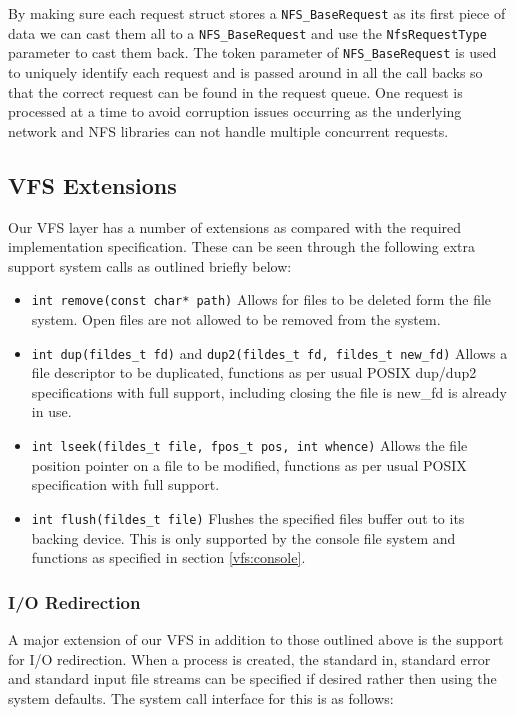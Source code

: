\documentclass[12pt,english]{article}
\begin{document}
By making sure each request struct stores a \texttt{NFS\_BaseRequest} as its first piece of data we can cast them all to a \texttt{NFS\_BaseRequest} and use the \texttt{NfsRequestType} parameter to cast them back. The token parameter of \texttt{NFS\_BaseRequest} is used to uniquely identify each request and is passed around in all the call backs so that the correct request can be found in the request queue. One request is processed at a time to avoid corruption issues occurring as the underlying network and NFS libraries can not handle multiple concurrent requests.

\subsection{VFS Extensions} \label{vfs:extensions}

Our VFS layer has a number of extensions as compared with the required implementation specification. These can be seen through the following extra support system calls as outlined briefly below:

\begin{itemize}
\item \texttt{int remove(const char* path)} Allows for files to be deleted form the file system. Open files are not allowed to be removed from the system.
\item \texttt{int dup(fildes\_t fd)} and \texttt{dup2(fildes\_t fd, fildes\_t new\_fd)} Allows a file descriptor to be duplicated, functions as per usual POSIX dup/dup2 specifications with full support, including closing the file is new\_fd is already in use.
\item \texttt{int lseek(fildes\_t file, fpos\_t pos, int whence)} Allows the file position pointer on a file to be modified, functions as per usual POSIX specification with full support.
\item \texttt{int flush(fildes\_t file)} Flushes the specified files buffer out to its backing device. This is only supported by the console file system and functions as specified in section \ref{vfs:console}.
\end{itemize}

\subsubsection{I/O Redirection} \label{vfs:redirect}

A major extension of our VFS in addition to those outlined above is the support for I/O redirection. When a process is created, the standard in, standard error and standard input file streams can be specified if desired rather then using the system defaults. The system call interface for this is as follows:
\end{document}
